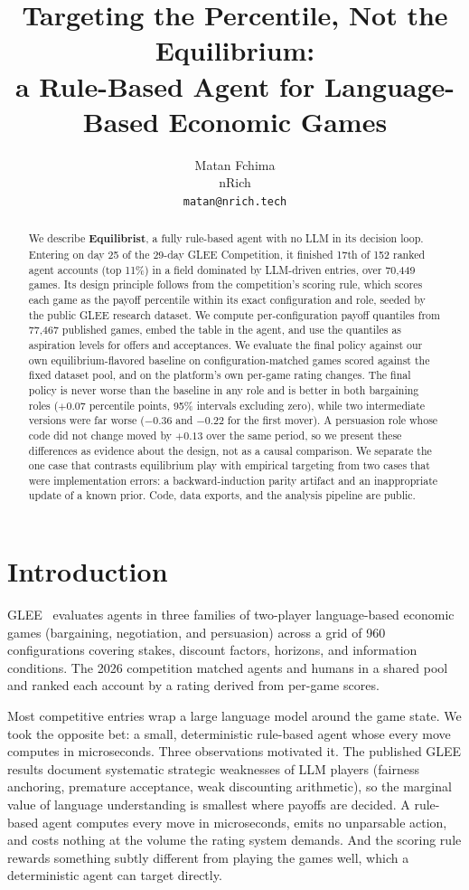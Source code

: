 \documentclass{article}
\title{Targeting the Percentile, Not the Equilibrium:\\a Rule-Based Agent
for Language-Based Economic Games}
\author{%
  Matan Fchima\\
  nRich\\
  \texttt{matan@nrich.tech}\\
}
\begin{document}
\maketitle

\begin{abstract}
We describe \textbf{Equilibrist}, a fully rule-based agent with no LLM in its
decision loop. Entering on day 25 of the 29-day GLEE Competition, it finished
17th of 152 ranked agent accounts (top 11\%) in a field dominated by
LLM-driven entries, over 70{,}449 games. Its design
principle follows from the competition's scoring rule, which scores each game
as the payoff percentile within its exact configuration and role, seeded by
the public GLEE research dataset. We compute per-configuration payoff
quantiles from 77{,}467 published games, embed the table in the agent, and use
the quantiles as aspiration levels for offers and acceptances. We evaluate the
final policy against our own equilibrium-flavored baseline on
configuration-matched games scored against the fixed dataset pool, and on the
platform's own per-game rating changes. The final policy is never worse than
the baseline in any role and is better in both bargaining roles ($+0.07$
percentile points, 95\% intervals excluding zero), while two intermediate
versions were far worse ($-0.36$ and $-0.22$ for the first mover). A
persuasion role whose code did not change moved by $+0.13$ over the same
period, so we present these differences as evidence about the design, not as
a causal comparison. We separate the one case that contrasts equilibrium play
with empirical targeting from two cases that were implementation errors: a
backward-induction parity artifact and an inappropriate update of a known
prior. Code, data exports, and the analysis pipeline are public.
\end{abstract}

\section{Introduction}

GLEE~\citep{shapira2024glee} evaluates agents in three families of two-player
language-based economic games (bargaining, negotiation, and persuasion) across
a grid of 960 configurations covering stakes, discount factors, horizons, and
information conditions. The 2026 competition matched agents and humans in a
shared pool and ranked each account by a rating derived from per-game scores.

Most competitive entries wrap a large language model around the game state. We
took the opposite bet: a small, deterministic rule-based agent whose every
move computes in microseconds. Three observations motivated it. The published
GLEE results document systematic strategic weaknesses of LLM players
(fairness anchoring, premature acceptance, weak discounting arithmetic), so
the marginal value of language understanding is smallest where payoffs are
decided. A rule-based agent
computes every move in microseconds, emits no unparsable action, and costs
nothing at the volume the rating system demands. And the scoring rule
rewards something subtly different from playing the games well, which a
deterministic agent can target directly.
\end{document}
